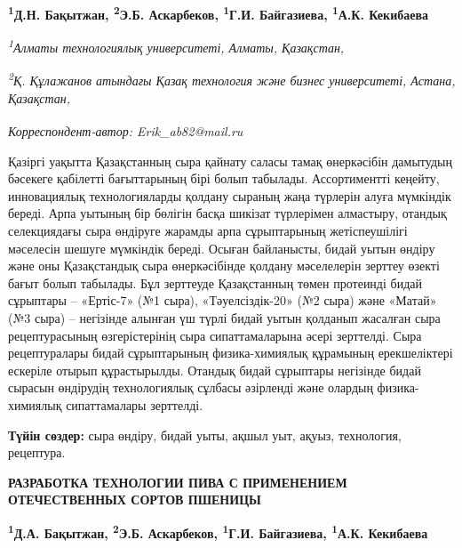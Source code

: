 
\begin{articleheader}

{\bfseries
\textsuperscript{1}Д.Н. Бақытжан\authorid,
\textsuperscript{2}Э.Б. Аскарбеков\textsuperscript{\envelope }\authorid,
\textsuperscript{1}Г.И. Байгазиева\authorid,
\textsuperscript{1}А.К. Кекибаева\authorid}
\end{articleheader}

\begin{affiliation}
\emph{\textsuperscript{1}Алматы технологиялық университеті, Алматы, Қазақстан,}

\emph{\textsuperscript{2}Қ. Құлажанов атындағы Қазақ технология және бизнес университеті, Астана, Қазақстан,}

\raggedright \textsuperscript{\envelope }{\em Корреспондент-автор: Erik\_ab82@mail.ru}
\end{affiliation}

Қазіргі уақытта Қазақстанның сыра қайнату саласы тамақ өнеркәсібін
дамытудың бәсекеге қабілетті бағыттарының бірі болып табылады.
Ассортиментті кеңейту, инновациялық технологияларды қолдану сыраның жаңа
түрлерін алуға мүмкіндік береді. Арпа уытының бір бөлігін басқа шикізат
түрлерімен алмастыру, отандық селекциядағы сыра өндіруге жарамды арпа
сұрыптарының жетіспеушілігі мәселесін шешуге мүмкіндік береді. Осыған
байланысты, бидай уытын өндіру және оны Қазақстандық сыра өнеркәсібінде
қолдану мәселелерін зерттеу өзекті бағыт болып табылады. Бұл зерттеуде
Қазақстанның төмен протеинді бидай сұрыптары -- «Ертіс-7» (№1 сыра),
«Тәуелсіздік-20» (№2 сыра) және «Матай» (№3 сыра) -- негізінде алынған
үш түрлі бидай уытын қолданып жасалған сыра рецептурасының
өзгерістерінің сыра сипаттамаларына әсері зерттелді. Сыра рецептуралары
бидай сұрыптарының физика-химиялық құрамының ерекшеліктері ескеріле
отырып құрастырылды. Отандық бидай сұрыптары негізінде бидай сырасын
өндірудің технологиялық сұлбасы әзірленді және олардың физика-химиялық
сипаттамалары зерттелді.

{\bfseries Түйін сөздер:} сыра өндіру, бидай уыты, ақшыл уыт, ақуыз,
технология, рецептура.

\begin{articleheader}
{\bfseries РАЗРАБОТКА ТЕХНОЛОГИИ ПИВА С ПРИМЕНЕНИЕМ ОТЕЧЕСТВЕННЫХ СОРТОВ ПШЕНИЦЫ}

{\bfseries
\textsuperscript{1}Д.А. Бақытжан,
\textsuperscript{2}Э.Б. Аскарбеков\textsuperscript{\envelope },
\textsuperscript{1}Г.И. Байгазиева,
\textsuperscript{1}А.К. Кекибаева}
\end{articleheader}

